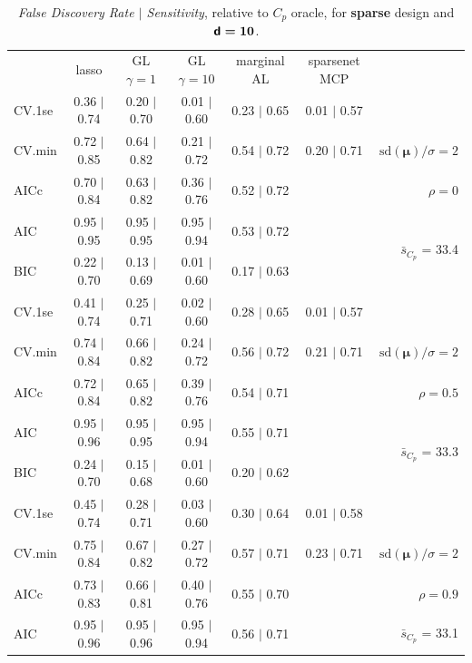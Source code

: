 \documentclass[12pt]{article}
\newcommand{\mr}[1]{\mathrm{#1}}
\newcommand{\bm}[1]{\mathbf{#1}}
\begin{document}
\begin{table}[p]\vspace{-.5cm}
\caption[l]{ {\it False Discovery Rate $\mid$ Sensitivity}, 
relative to $C_p$ oracle, for {\bf sparse} design and $\boldsymbol{{\sf d}=10}$.}
\vspace{-.5cm}
\small{}
\begin{center}
\begin{tabular}{l*{5}{c}|r}
 & lasso & GL $\gamma=1$ & GL $\gamma=10$ & marginal AL & sparsenet MCP  & \\
 \cline{1-7}
CV.1se & 0.36 $\mid$ 0.74 & 0.20 $\mid$ 0.70 & 0.01 $\mid$ 0.60 & 0.23 $\mid$ 0.65 & 0.01 $\mid$ 0.57 &\\
CV.min & 0.72 $\mid$ 0.85 & 0.64 $\mid$ 0.82 & 0.21 $\mid$ 0.72 & 0.54 $\mid$ 0.72 & 0.20 $\mid$ 0.71 &  $\mr{sd}(\bm{\mu})/\sigma=2$ \\
AICc & 0.70 $\mid$ 0.84 & 0.63 $\mid$ 0.82 & 0.36 $\mid$ 0.76 & 0.52 $\mid$ 0.72 & & $\rho=0$ \\
AIC & 0.95 $\mid$ 0.95 & 0.95 $\mid$ 0.95 & 0.95 $\mid$ 0.94 & 0.53 $\mid$ 0.72 & & \multirow{2}{*}{$\bar{s}_{C_p}$ = 33.4} \\
BIC & 0.22 $\mid$ 0.70 & 0.13 $\mid$ 0.69 & 0.01 $\mid$ 0.60 & 0.17 $\mid$ 0.63 & & \\
 \hline 
CV.1se & 0.41 $\mid$ 0.74 & 0.25 $\mid$ 0.71 & 0.02 $\mid$ 0.60 & 0.28 $\mid$ 0.65 & 0.01 $\mid$ 0.57 &\\
CV.min & 0.74 $\mid$ 0.84 & 0.66 $\mid$ 0.82 & 0.24 $\mid$ 0.72 & 0.56 $\mid$ 0.72 & 0.21 $\mid$ 0.71 &  $\mr{sd}(\bm{\mu})/\sigma=2$ \\
AICc & 0.72 $\mid$ 0.84 & 0.65 $\mid$ 0.82 & 0.39 $\mid$ 0.76 & 0.54 $\mid$ 0.71 & & $\rho=0.5$ \\
AIC & 0.95 $\mid$ 0.96 & 0.95 $\mid$ 0.95 & 0.95 $\mid$ 0.94 & 0.55 $\mid$ 0.71 & & \multirow{2}{*}{$\bar{s}_{C_p}$ = 33.3} \\
BIC & 0.24 $\mid$ 0.70 & 0.15 $\mid$ 0.68 & 0.01 $\mid$ 0.60 & 0.20 $\mid$ 0.62 & & \\
 \hline 
CV.1se & 0.45 $\mid$ 0.74 & 0.28 $\mid$ 0.71 & 0.03 $\mid$ 0.60 & 0.30 $\mid$ 0.64 & 0.01 $\mid$ 0.58 &\\
CV.min & 0.75 $\mid$ 0.84 & 0.67 $\mid$ 0.82 & 0.27 $\mid$ 0.72 & 0.57 $\mid$ 0.71 & 0.23 $\mid$ 0.71 &  $\mr{sd}(\bm{\mu})/\sigma=2$ \\
AICc & 0.73 $\mid$ 0.83 & 0.66 $\mid$ 0.81 & 0.40 $\mid$ 0.76 & 0.55 $\mid$ 0.70 & & $\rho=0.9$ \\
AIC & 0.95 $\mid$ 0.96 & 0.95 $\mid$ 0.96 & 0.95 $\mid$ 0.94 & 0.56 $\mid$ 0.71 & & \multirow{2}{*}{$\bar{s}_{C_p}$ = 33.1} \\

\end{tabular}
\end{center}
\end{table}
\end{document}
